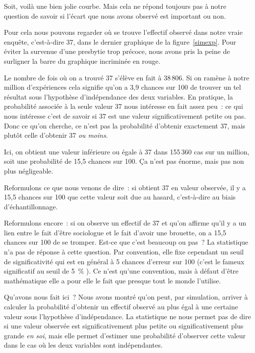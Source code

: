 \documentclass[a4paper,10pt,twoside,francais]{report}
\begin{document}
Soit, voilà une bien jolie courbe. Mais cela ne répond toujours pas à
notre question de savoir si l'écart que nous avons observé est
\og important \fg{} ou non. 

Pour cela nous pouvons regarder où se trouve l'effectif observé dans
notre \og vraie \fg{} enquête, c'est-à-dire 37, dans le dernier graphique
de la figure~\ref{simexp}. Pour éviter la survenue d'une presbytie
trop précoce, nous avons pris la peine de surligner la barre du
graphique incriminée en rouge.

Le nombre de fois où on a trouvé 37 s'élève en fait à 38\,806. Si on
ramène à notre million d'expériences cela signifie qu'on a 3,9 chances
sur 100 de trouver un tel résultat sous l'hypothèse d'indépendance des
deux variables. En pratique, la probabilité associée à la seule valeur
37 nous intéresse en fait assez peu~: ce qui nous intéresse c'est de
savoir si 37 est une valeur \og significativement petite \fg{} ou
pas. Donc ce qu'on cherche, ce n'est pas la probabilité d'obtenir
exactement 37, mais plutôt celle d'obtenir 37 \textit{ou moins}.

Ici, on obtient une valeur inférieure ou égale à 37 dans 155\,360 cas
sur un million, soit une probabilité de 15,5 chances sur 100. Ça n'est
pas énorme, mais pas non plus négligeable.

Reformulons ce que nous venons de dire~: si obtient 37 en valeur
observée, il y a 15,5 chances sur 100 que cette valeur soit due au
hasard, c'est-à-dire au biais d'échantillonnage.

Reformulons encore~: si on observe un effectif de 37 et qu'on affirme
qu'il y a un lien entre le fait d'être sociologue et le fait d'avoir
une brouette, on a 15,5 chances sur 100 de se tromper. Est-ce que
c'est beaucoup ou pas~? La statistique n'a pas de réponse à cette
question. Par convention, elle fixe cependant un \og seuil de
significativité \fg{} qui est en général à 5 chances d'erreur sur 100
(c'est le fameux \og significatif au seuil de 5~\% \fg{}). Ce n'est qu'une
convention, mais à défaut d'être mathématique elle a pour elle le fait
que presque tout le monde l'utilise.

Qu'avons nous fait ici~? Nous avons montré qu'on peut, par simulation,
arriver à calculer la probabilité d'obtenir un effectif observé au
plus égal à une certaine valeur sous l'hypothèse d'indépendance. La
statistique ne nous permet pas de dire si une valeur observée est
significativement plus petite ou significativement plus grande
\textit{en soi}, mais elle permet d'estimer une probabilité d'observer
cette valeur dans le cas où les deux variables sont indépendantes.
\end{document}
